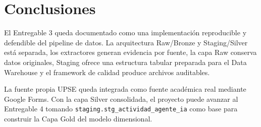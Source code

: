 \documentclass[12pt,a4paper]{article}
\newcommand{\StagingTabla}{\texttt{staging.stg\_actividad\_agente\_ia}}
\begin{document}
\section{Conclusiones}

El Entregable 3 queda documentado como una implementaci\'on reproducible y defendible del pipeline de datos. La arquitectura Raw/Bronze y Staging/Silver est\'a separada, los extractores generan evidencia por fuente, la capa Raw conserva datos originales, Staging ofrece una estructura tabular preparada para el Data Warehouse y el framework de calidad produce archivos auditables.

La fuente propia UPSE queda integrada como fuente acad\'emica real mediante Google Forms. Con la capa Silver consolidada, el proyecto puede avanzar al Entregable 4 tomando \StagingTabla{} como base para construir la Capa Gold del modelo dimensional.
\end{document}
